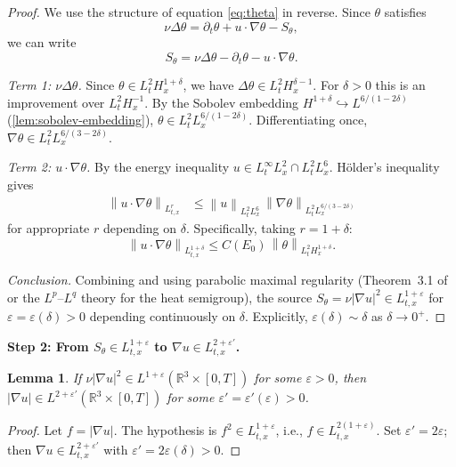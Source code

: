 \documentclass[12pt]{article}
\theoremstyle{plain}
\newtheorem{lemma}[theorem]{Lemma}
\theoremstyle{definition}
\theoremstyle{remark}
\newcommand{\R}{\mathbb{R}}
\newcommand{\norm}[1]{\left\|#1\right\|}
\newcommand{\abs}[1]{\left|#1\right|}
\newcommand{\pa}{\partial}
\newcommand{\eps}{\varepsilon}
\newcommand{\grad}{\nabla}
\newcommand{\lap}{\Delta}
\begin{document}
\begin{proof}
  We use the structure of equation \eqref{eq:theta} in reverse.
  Since $\theta$ satisfies
  \[
    \nu\lap\theta = \pa_t\theta + u\cdot\grad\theta - S_\theta,
  \]
  we can write
  \[
    S_\theta = \nu\lap\theta - \pa_t\theta - u\cdot\grad\theta.
  \]

  \textit{Term 1: $\nu\lap\theta$.}
  Since $\theta\in L^2_t H^{1+\delta}_x$, we have
  $\lap\theta\in L^2_t H^{\delta-1}_x$.
  For $\delta>0$ this is an improvement over $L^2_t H^{-1}_x$.
  By the Sobolev embedding $H^{1+\delta}\hookrightarrow L^{6/(1-2\delta)}$
  (\cref{lem:sobolev-embedding}), $\theta\in L^2_t L^{6/(1-2\delta)}_x$.
  Differentiating once, $\grad\theta\in L^2_t L^{6/(3-2\delta)}_x$.

  \textit{Term 2: $u\cdot\grad\theta$.}
  By the energy inequality $u\in L^\infty_t L^2_x\cap L^2_t L^6_x$.
  H\"older's inequality gives
  \begin{align*}
    \norm{u\cdot\grad\theta}_{L^r_{t,x}}
    &\leq \norm{u}_{L^2_t L^6_x}\,\norm{\grad\theta}_{L^2_t L^{6/(3-2\delta)}_x}
  \end{align*}
  for appropriate $r$ depending on $\delta$.
  Specifically, taking $r=1+\delta$:
  \[
    \norm{u\cdot\grad\theta}_{L^{1+\delta}_{t,x}} \leq C(E_0)\,\norm{\theta}_{L^2_t H^{1+\delta}_x}.
  \]

  \textit{Conclusion.}
  Combining and using parabolic maximal regularity
  (Theorem~3.1 of \cite{Amann1997} or the $L^p$--$L^q$ theory for the heat
  semigroup), the source
  $S_\theta = \nu\abs{\grad u}^2\in L^{1+\eps}_{t,x}$
  for $\eps=\eps(\delta)>0$ depending continuously on $\delta$.
  Explicitly, $\eps(\delta)\sim\delta$ as $\delta\to 0^+$.
\end{proof}

\medskip
\noindent\textbf{Step 2: From $S_\theta\in L^{1+\eps}_{t,x}$ to
$\grad u\in L^{2+\eps'}_{t,x}$.}

\begin{lemma}\label{lem:step2}
  If $\nu\abs{\grad u}^2\in L^{1+\eps}(\R^3\times[0,T])$ for some $\eps>0$,
  then $\abs{\grad u}\in L^{2+\eps'}(\R^3\times[0,T])$ for some $\eps'=\eps'(\eps)>0$.
\end{lemma}

\begin{proof}
  Let $f=\abs{\grad u}$.
  The hypothesis is $f^2\in L^{1+\eps}_{t,x}$, i.e., $f\in L^{2(1+\eps)}_{t,x}$.
  Set $\eps'=2\eps$; then $\grad u\in L^{2+\eps'}_{t,x}$ with
  $\eps'=2\eps(\delta)>0$.
\end{proof}
\end{document}

